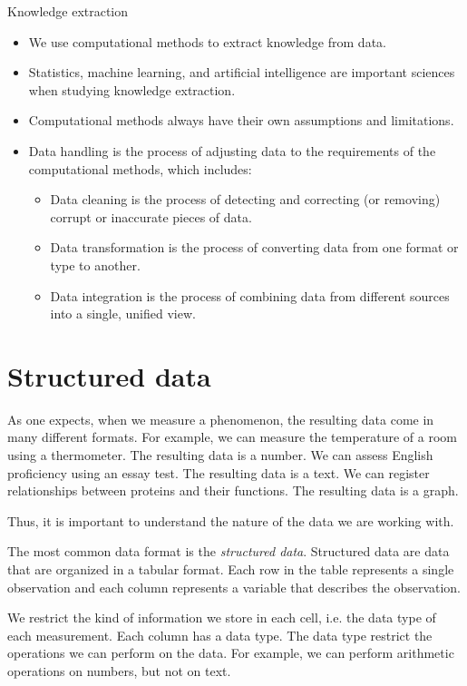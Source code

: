 \begin{slidebox}{Knowledge extraction}{}
  \begin{itemize}
    \item We use computational methods to extract knowledge from data.
    \item Statistics, machine learning, and artificial intelligence are important
      sciences when studying knowledge extraction.
    \item Computational methods always have their own assumptions and limitations.
    \item Data handling is the process of adjusting data to the requirements of the
      computational methods, which includes:
    \begin{itemize}
    \item Data cleaning is the process of detecting and correcting (or removing) corrupt
      or inaccurate pieces of data.
    \item Data transformation is the process of converting data from one format or type
      to another.
    \item Data integration is the process of combining data from different sources into
      a single, unified view.
    \end{itemize}
  \end{itemize}
\end{slidebox}

\section{Structured data}

As one expects, when we measure a phenomenon, the resulting data come in many different
formats.  For example, we can measure the temperature of a room using a thermometer.  The
resulting data is a number.  We can assess English proficiency using an essay test.  The
resulting data is a text.  We can register relationships between proteins and
their functions.  The resulting data is a graph.

Thus, it is important to understand the nature of the data we are working with.

The most common data format is the \emph{structured data}.  Structured data are data that
are organized in a tabular format.  Each row in the table represents a single observation
and each column represents a variable that describes the observation.

We restrict the kind of information we store in each cell, i.e. the data type of each
measurement.  Each column has a data type.  The data type restrict the operations we can
perform on the data.  For example, we can perform arithmetic operations on numbers, but
not on text.

